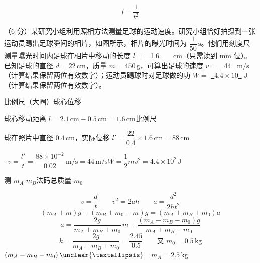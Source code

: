 \[ l-\frac{1}{t^2} \]
\begin{problem}
（6 分）某研究小组利用照相方法测量足球的运动速度。研究小组恰好拍摄到一张运动员踢出足球瞬间的相片，如图所示，相片的曝光时间为 $\dfrac{1}{50}\,\mathrm{s}$。他们用刻度尺测量曝光时间内足球在相片中移动的长度 $l=$ \underline{\ 1.6\ }\ \ \ $\mathrm{cm}$（只需读到 mm 位）。已知足球的直径 $d=22\,\mathrm{cm}$，质量 $m=450\,\mathrm{g}$，可算出足球的速度 $v=$ \underline{\ 44\ } $\mathrm{m/s}$（计算结果保留两位有效数字）；运动员踢球时对足球做的功 $W=$ \underline{\ $4.4\times10$\ } $\mathrm{J}$（计算结果保留两位有效数字）。


\begin{solution}
比例尺（大圈）\quad 球心位移

球心移动距离 $l=2.1\,\mathrm{cm}-0.5\,\mathrm{cm}=1.6\,\mathrm{cm}$\qquad 比例尺

球在照片中直径 $0.4\,\mathrm{cm}$，实际位移 $l'=\dfrac{22}{0.4}\times1.6\,\mathrm{cm}=88\,\mathrm{cm}$

$\therefore v=\dfrac{l'}{t}=\dfrac{88\times10^{-2}}{0.02}\,\mathrm{m/s}=44\,\mathrm{m/s}$\qquad $W=\dfrac12mv^2=4.4\times10^2\,\mathrm{J}$
\end{solution}
\end{problem}
\begin{problem}
测 $m_A$ $m_B$\quad 法码总质量 $m_0$ %



\begin{solution}
\[ v=\frac{d}{t}\qquad v^2=2ah\qquad a=\frac{d^2}{2ht^2} \]
\[ (m_A+m)g-(m_B+m_0-m)g=(m_A+m_B+m_0)a \]
\[ a=\frac{2g}{m_A+m_B+m_0}\,m+\frac{(m_A-m_B-m_0)g}{m_A+m_B+m_0} \]
\[ k=\frac{2g}{m_A+m_B+m_0}=\frac{2.45}{0.5}\qquad\text{又 }m_0=0.5\,\mathrm{kg} \]
$(m_A-m_B-m_0)\,\unclear{…}$\ \ $m_A=2.5\,\mathrm{kg}$
\end{solution}
\end{problem}
